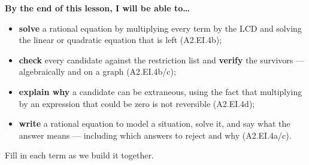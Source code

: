 \documentclass[10pt]{article}
\begin{document}
\namedateperiod

\vspace{0.08in}

\begin{objectivebox}
\textbf{By the end of this lesson, I will be able to\dots}
\begin{itemize}\setlength{\itemsep}{2pt}
  \item \textbf{solve} a rational equation by multiplying every term by the LCD and solving the linear or quadratic equation that is left (A2.EI.4b);
  \item \textbf{check} every candidate against the restriction list and \textbf{verify} the survivors --- algebraically and on a graph (A2.EI.4b/c);
  \item \textbf{explain why} a candidate can be extraneous, using the fact that multiplying by an expression that could be zero is not reversible (A2.EI.4d);
  \item \textbf{write} a rational equation to model a situation, solve it, and say what the answer means --- including which answers to reject and why (A2.EI.4a/c).
\end{itemize}
\end{objectivebox}

\vspace{0.05in}

\begin{vocabbox}
\small
Fill in each term as we build it together.
\par\vspace{2pt}   %
\end{vocabbox}
\end{document}
